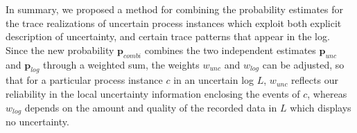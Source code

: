 In summary, we proposed a method for combining the probability estimates for the trace realizations of uncertain process instances which exploit both explicit description of uncertainty, and certain trace patterns that appear in the log.
Since the new probability $\textbf{p}_{combi}$ combines the two independent estimates $\textbf{p}_{unc}$ and $\textbf{p}_{log}$ through a weighted sum, the weights $w_{unc}$ and $w_{log}$ can be adjusted, so that for a particular process instance $c$ in an uncertain log $L$, $w_{unc}$ reflects our reliability in the local uncertainty information enclosing the events of $c$, whereas $w_{log}$ depends on the amount and quality of the recorded data in $L$ which displays no uncertainty.
